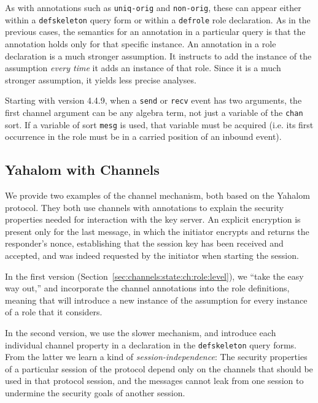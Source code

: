 As with annotations such as \verb|uniq-orig| and \verb|non-orig|,
these can appear either within a \verb|defskeleton| query form or
within a \verb|defrole| role declaration.  As in the previous cases,
the semantics for an annotation in a particular query is that the
annotation holds only for that specific instance.  An annotation in a
role declaration is a much stronger assumption.  It instructs {\cpsa}
to add the instance of the assumption \emph{every time} it adds an
instance of that role.  Since it is a much stronger assumption, it
yields less precise analyses.

Starting with {\cpsa} version 4.4.9, when a \verb|send| or \verb|recv|
event has two arguments, the first channel argument can be any algebra
term, not just a variable of the \verb|chan| sort. If a variable of
sort \verb|mesg| is used, that variable must be acquired (i.e. its
first occurrence in the role must be in a carried position of an
inbound event). 

\subsection{Yahalom with Channels}
\label{sec:channels:state:ch:yahalom}

We provide two examples of the channel mechanism, both based on the
Yahalom protocol.  They both use channels with annotations to explain
the security properties needed for interaction with the key server.
An explicit encryption is present only for the last message, in which
the initiator encrypts and returns the responder's nonce, establishing
that the session key has been received and accepted, and was indeed
requested by the initiator when starting the session.

In the first version (Section~\ref{sec:channels:state:ch:role:level}),
we ``take the easy way out,'' and incorporate the channel annotations
into the role definitions, meaning that {\cpsa} will introduce a new
instance of the assumption for every instance of a role that it
considers.

In the second version, we use the slower mechanism, and introduce each
individual channel property in a declaration in the \verb|defskeleton|
query forms.  From the latter we learn a kind of
\emph{session-independence\/}:  The security properties of a
particular session of the protocol depend only on the channels that
should be used in that protocol session, and the messages cannot leak
from one session to undermine the security goals of another session.

